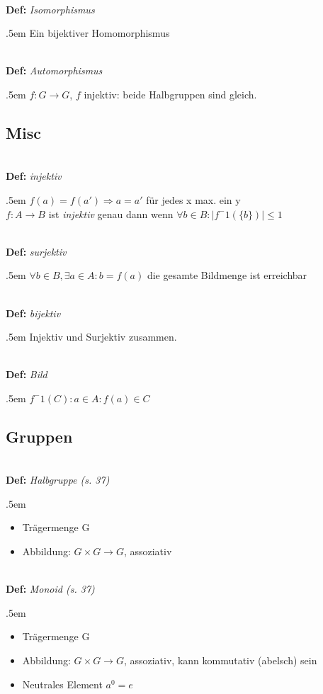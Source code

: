 \documentclass[twocolumn, 10pt]{article}
\newenvironment {definition}
                [1][]
                {\noindent\\{\bf
                Def:}\emph{
                #1}\indent\begin{addmargin}{.5em}}{\end{addmargin}}
\begin{document}
\begin{definition}[Isomorphismus]
Ein bijektiver Homomorphismus
\end{definition}

\begin{definition}[Automorphismus]
$f:G \rightarrow G$, $f$ injektiv: beide Halbgruppen sind gleich.
\end{definition}



\subsection*{Misc}
\begin{definition}[injektiv]
$f(a)=f(a') \Rightarrow a=a'$ \glqq für jedes x max. ein y\grqq\\
$f:A\rightarrow B$ ist \emph{injektiv} genau dann wenn $\forall b \in B:
|f^-1(\{b\})| \leq 1$
\end{definition}

\begin{definition}[surjektiv]
$\forall b \in B, \exists a \in A: b = f(a)$ \glqq die gesamte Bildmenge ist
erreichbar\grqq
\end{definition}

\begin{definition}[bijektiv]
Injektiv und Surjektiv zusammen.
\end{definition}

\begin{definition}[Bild]
$f^-1(C):{a \in A: f(a) \in C}$
\end{definition}



\subsection*{Gruppen}

\begin{definition}[Halbgruppe (s. 37)]
\begin{itemize}
  \item Trägermenge G
  \item Abbildung: $G \times G \rightarrow G$, assoziativ
\end{itemize}
\end{definition}

\begin{definition}[Monoid (s. 37)]
\begin{itemize}
  \item Trägermenge G
  \item Abbildung: $G \times G \rightarrow G$, assoziativ, kann kommutativ
  (abelsch) sein
  \item Neutrales Element $a^0 = e$
\end{itemize}
\end{definition}
\end{document}
